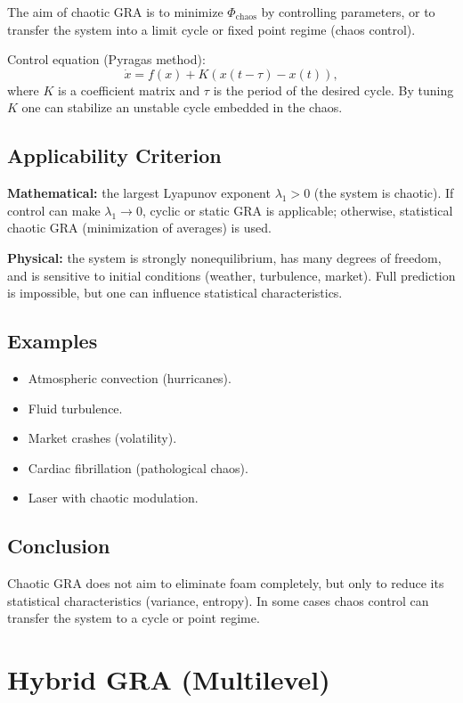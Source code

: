 \documentclass[12pt,a4paper]{article}
\begin{document}
The aim of chaotic GRA is to minimize $\Phi_{\text{chaos}}$ by controlling parameters, or to transfer the system into a limit cycle or fixed point regime (chaos control).

Control equation (Pyragas method):
\begin{equation}
    \dot{x} = f(x) + K(x(t-\tau) - x(t)),
\end{equation}
where $K$ is a coefficient matrix and $\tau$ is the period of the desired cycle. By tuning $K$ one can stabilize an unstable cycle embedded in the chaos.

\subsection{Applicability Criterion}

\textbf{Mathematical:} the largest Lyapunov exponent $\lambda_1 > 0$ (the system is chaotic). If control can make $\lambda_1 \to 0$, cyclic or static GRA is applicable; otherwise, statistical chaotic GRA (minimization of averages) is used.

\textbf{Physical:} the system is strongly nonequilibrium, has many degrees of freedom, and is sensitive to initial conditions (weather, turbulence, market). Full prediction is impossible, but one can influence statistical characteristics.

\subsection{Examples}
\begin{itemize}
    \item Atmospheric convection (hurricanes).
    \item Fluid turbulence.
    \item Market crashes (volatility).
    \item Cardiac fibrillation (pathological chaos).
    \item Laser with chaotic modulation.
\end{itemize}

\subsection{Conclusion}
Chaotic GRA does not aim to eliminate foam completely, but only to reduce its statistical characteristics (variance, entropy). In some cases chaos control can transfer the system to a cycle or point regime.

\section{Hybrid GRA (Multilevel)}
\label{sec:hybrid}
\end{document}
